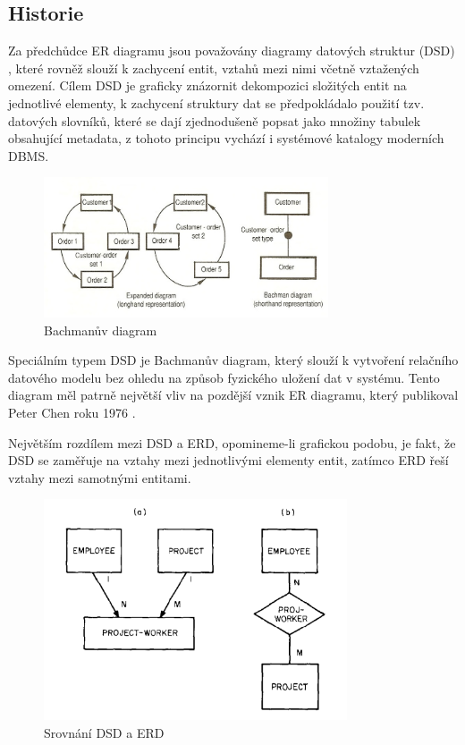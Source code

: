 \documentclass[czech,bachelor,public,dept460,male,oneside]{diploma}
\begin{document}
	\subsection{Historie}
	Za předchůdce ER diagramu jsou považovány diagramy datových struktur (DSD) \cite{bachmanDsd}, které rovněž slouží k zachycení entit, vztahů mezi nimi včetně vztažených omezení. Cílem DSD je graficky znázornit dekompozici složitých entit na jednotlivé elementy, k zachycení struktury dat se předpokládalo použití tzv. datových slovníků, které se dají zjednodušeně popsat jako množiny tabulek obsahující metadata, z tohoto principu vychází i systémové katalogy moderních DBMS.
	
	\begin{figure}[!h]
		\centering
		\includegraphics[width=0.75\textwidth]{Figures/BachmanDiagram}
		\caption[Bachmanův diagram]{Bachmanův diagram \cite{wikiDsd}}
	\end{figure}
	
	Speciálním typem DSD je Bachmanův diagram, který slouží k vytvoření relačního datového modelu bez ohledu na způsob fyzického uložení dat v systému. Tento diagram měl patrně největší vliv na pozdější vznik ER diagramu, který publikoval Peter Chen roku 1976 \cite{chenERD}.
	
	Největším rozdílem mezi DSD a ERD, opomineme-li grafickou podobu, je fakt, že DSD se zaměřuje na vztahy mezi jednotlivými elementy entit, zatímco ERD řeší vztahy mezi samotnými entitami.
	
	\begin{figure}[!h]
		\centering
		\includegraphics[width=0.80\textwidth]{Figures/ChenVsDSD}
		\subfloat[ER diagram]{\hspace{.25\linewidth}}
		\caption[Srovnání DSD a ERD]{Srovnání DSD a ERD \cite{chenERD}}
	\end{figure}
	
\end{document}
